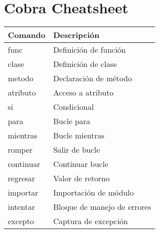 \documentclass{article}
\begin{document}
\section*{Cobra Cheatsheet}
\begin{tabular}{ll}
\textbf{Comando} & \textbf{Descripción}\\\hline
func & Definición de función\\
clase & Definición de clase\\
metodo & Declaración de método\\
atributo & Acceso a atributo\\
si & Condicional\\
para & Bucle para\\
mientras & Bucle mientras\\
romper & Salir de bucle\\
continuar & Continuar bucle\\
regresar & Valor de retorno\\
importar & Importación de módulo\\
intentar & Bloque de manejo de errores\\
excepto & Captura de excepción\\
\end{tabular}
\end{document}
